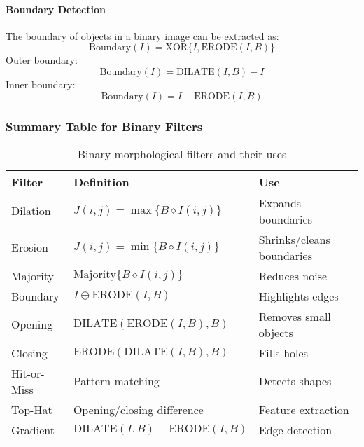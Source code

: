 \paragraph{Boundary Detection}

The boundary of objects in a binary image can be extracted as:
$$
\text{Boundary}(I) = \text{XOR}\{I, \text{ERODE}(I,B)\}
$$
Outer boundary:
\[
\text{Boundary}(I) = \text{DILATE}(I,B) - I
\]
Inner boundary:
\[
\text{Boundary}(I) = I - \text{ERODE}(I,B)
\]



\subsubsection*{Summary Table for Binary Filters}

\begin{table}[H]
  \centering
  \begin{tabular}{|l|l|l|}
  \hline
  \textbf{Filter} & \textbf{Definition} & \textbf{Use} \\
  \hline
  Dilation & $J(i,j) = \max \{ B \diamond I(i,j) \}$ & Expands boundaries \\
  Erosion & $J(i,j) = \min \{ B \diamond I(i,j) \}$ & Shrinks/cleans boundaries \\
  Majority & $\text{Majority}\{ B \diamond I(i,j) \}$ & Reduces noise \\
  Boundary & $I \oplus \text{ERODE}(I,B)$ & Highlights edges \\
  Opening & $\text{DILATE}(\text{ERODE}(I,B),B)$ & Removes small objects \\
  Closing & $\text{ERODE}(\text{DILATE}(I,B),B)$ & Fills holes \\
  Hit-or-Miss & Pattern matching & Detects shapes \\
  Top-Hat & Opening/closing difference & Feature extraction \\
  Gradient & $\text{DILATE}(I,B) - \text{ERODE}(I,B)$ & Edge detection \\
  \hline
  \end{tabular}
  \caption{Binary morphological filters and their uses}
\end{table}
